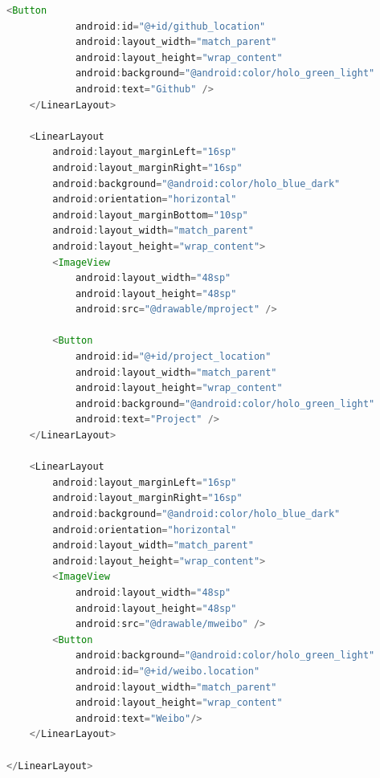 \documentclass[UTF8, Microsoft YaHei]{book}
\begin{document}
\begin{small}
\begin{lstlisting}[language=java]
        <Button
            android:id="@+id/github_location"
            android:layout_width="match_parent"
            android:layout_height="wrap_content"
            android:background="@android:color/holo_green_light"
            android:text="Github" />
    </LinearLayout>

    <LinearLayout
        android:layout_marginLeft="16sp"
        android:layout_marginRight="16sp"
        android:background="@android:color/holo_blue_dark"
        android:orientation="horizontal"
        android:layout_marginBottom="10sp"
        android:layout_width="match_parent"
        android:layout_height="wrap_content">
        <ImageView
            android:layout_width="48sp"
            android:layout_height="48sp"
            android:src="@drawable/mproject" />

        <Button
            android:id="@+id/project_location"
            android:layout_width="match_parent"
            android:layout_height="wrap_content"
            android:background="@android:color/holo_green_light"
            android:text="Project" />
    </LinearLayout>

    <LinearLayout
        android:layout_marginLeft="16sp"
        android:layout_marginRight="16sp"
        android:background="@android:color/holo_blue_dark"
        android:orientation="horizontal"
        android:layout_width="match_parent"
        android:layout_height="wrap_content">
        <ImageView
            android:layout_width="48sp"
            android:layout_height="48sp"
            android:src="@drawable/mweibo" />
        <Button
            android:background="@android:color/holo_green_light"
            android:id="@+id/weibo.location"
            android:layout_width="match_parent"
            android:layout_height="wrap_content"
            android:text="Weibo"/>
    </LinearLayout>

</LinearLayout>
\end{lstlisting}
\end{small}
\end{document}
